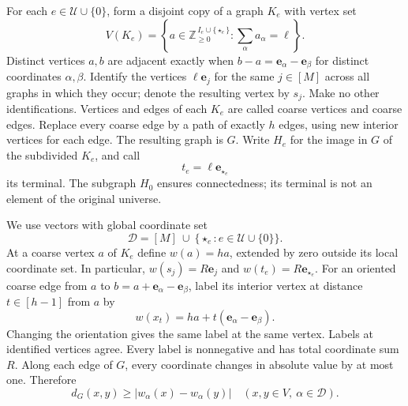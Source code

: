 \documentclass[11pt]{article}
\numberwithin{equation}{section}
\theoremstyle{definition}
\newcommand{\Z}{\mathbb Z}
\begin{document}
For each $e\in\mathcal U\cup\{0\}$, form a disjoint copy of a graph
$K_e$ with vertex set
\begin{equation}\label{eq:simplex-vertices}
 V(K_e)=
 \left\{a\in\Z_{\ge0}^{\,I_e\cup\{\star_e\}}:
                        \sum_\alpha a_\alpha=\ell\right\}.
\end{equation}
Distinct vertices $a,b$ are adjacent exactly when
$b-a=\mathbf e_\alpha-\mathbf e_\beta$ for distinct coordinates
$\alpha,\beta$. Identify the vertices $\ell\mathbf e_j$ for the same
$j\in[M]$ across all graphs in which they occur; denote the resulting
vertex by $s_j$. Make no other identifications.
Vertices and edges of each $K_e$ are called coarse vertices and coarse
edges. Replace every coarse edge by a path of exactly $h$ edges, using new interior
vertices for each edge. The resulting graph is $G$.
Write $H_e$ for the image in $G$ of the subdivided $K_e$, and call
\[
 t_e=\ell\mathbf e_{\star_e}
\]
its terminal. The subgraph $H_0$ ensures connectedness; its terminal is
not an element of the original universe.

We use vectors with global coordinate set
\[
 \mathcal D=[M]\ \cup\ \{\star_e:e\in\mathcal U\cup\{0\}\}.
\]
At a coarse vertex $a$ of $K_e$ define $w(a)=ha$, extended by zero
outside its local coordinate set. In particular, $w(s_j)=R\mathbf e_j$
and $w(t_e)=R\mathbf e_{\star_e}$.
For an oriented coarse edge from $a$ to
$b=a+\mathbf e_\alpha-\mathbf e_\beta$, label its interior vertex at
distance $t\in[h-1]$ from $a$ by
\begin{equation}\label{eq:subdivision-label}
 w(x_t)=ha+t(\mathbf e_\alpha-\mathbf e_\beta).
\end{equation}
Changing the orientation gives the same label at the same vertex.
Labels at identified vertices agree. Every label is nonnegative and
has total coordinate sum $R$. Along each edge of $G$, every coordinate
changes in absolute value by at most one. Therefore
\begin{equation}\label{eq:coordinate-lower-bound}
 d_G(x,y)\ge |w_\alpha(x)-w_\alpha(y)|
 \quad(x,y\in V,\ \alpha\in\mathcal D).
\end{equation}
\end{document}

